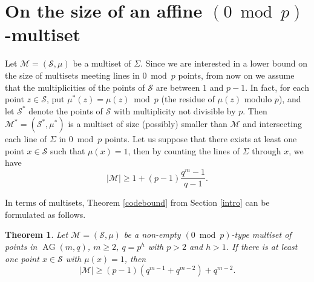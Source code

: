 \documentclass[12pt]{article}
\newcommand{\cM}{{\mathcal M}}
\newcommand{\cS}{{\mathcal S}}
\newtheorem{theorem}{Theorem}[section]
\DeclareMathOperator{\AG}{{AG}}
\begin{document}
\section{\texorpdfstring{On the size of an affine $(0 \bmod p)$-multiset}{On the size of an affine (0 mod p)-multiset}} \label{sec: main-result}

Let $\cM=(\cS,\mu)$ be a multiset of $\Sigma$. Since we are interested in a lower bound on the size  of multisets meeting lines in $0 \bmod p$ points, from now on we assume that the multiplicities of the points of $\cS$ are between $1$ and $p-1$. In fact, for each point $z \in \cS$, put $\mu^*(z)= \mu(z) \bmod p$ (the residue of $\mu(z)$ modulo $p$), and let $\cS^*$ denote the points of $\cS$ with multiplicity not divisible by $p$. Then $\mathcal{M}^*=(\cS^*,\mu^*)$ is a multiset of size (possibly) smaller than $\cM$ and intersecting each line of $\Sigma$ in  $0 \bmod p$ points. Let us suppose that there exists at least one point $x \in \cS$ such that $\mu(x)=1$, then by counting the lines of $\Sigma$ through $x$, we have 
\begin{equation}\label{eq:trivial}
	\vert \mathcal{M} \vert \geq 1+ (p-1) \frac{q^m-1}{q-1} .
\end{equation}

In terms of multisets, Theorem \ref{codebound} from Section \ref{intro} can be formulated as follows. 


\begin{theorem}
	\label{th:lowerbound}
	Let $\cM=(\cS,\mu)$ be a non-empty $(0 \bmod p)$-type multiset of points in $\AG(m,q)$, $m\geq 2$, $q=p^h$ with $p>2$ and $h>1$. If there is at least one point $x\in \cS$ with $\mu(x)=1$, then 
	\begin{equation}
		\label{lowerbound}
		|\cM|\geq (p-1)(q^{m-1}+q^{m-2})+q^{m-2}. 
	\end{equation}
\end{theorem}
\end{document}
